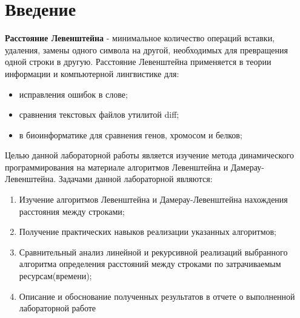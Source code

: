 \documentclass[a4paper, 12pt]{article}
\begin{document}
\section*{Введение}

\begin{flushleft}
	 \hspace*{5mm} {\bf Расстояние Левенштейна} - минимальное количество операций вставки, удаления, замены одного символа на другой,
	необходимых для превращения одной строки в другую.
	\newline \hspace*{5mm} Расстояние Левенштейна применяется в теории информации и компьютерной лингвистике для:
	\begin{itemize}
		\item исправления ошибок в слове;
		\item сравнения текстовых файлов утилитой diff;
		\item в биоинформатике для сравнения генов, хромосом и белков;
	\end{itemize}
	\hspace*{5mm} Целью данной лабораторной работы является изучение метода динамического программирования на материале алгоритмов Левенштейна и Дамерау-Левенштейна. 
	\newline \hspace*{5mm} Задачами данной лабораторной являются: 
	\begin{enumerate}
		\item Изучение алгоритмов Левенштейна и Дамерау-Левенштейна нахождения расстояния между строками;
		\item Получение практических навыков реализации указанных алгоритмов;
		\item Сравнительный анализ линейной и рекурсивной реализаций выбранного алгоритма определения расстояний между строками по затрачиваемым ресурсам(времени);
		\item Описание и обоснование полученных результатов в отчете о выполненной лабораторной работе
    \end{enumerate}
		
\end{flushleft}
\clearpage
\newpage
\end{document}
